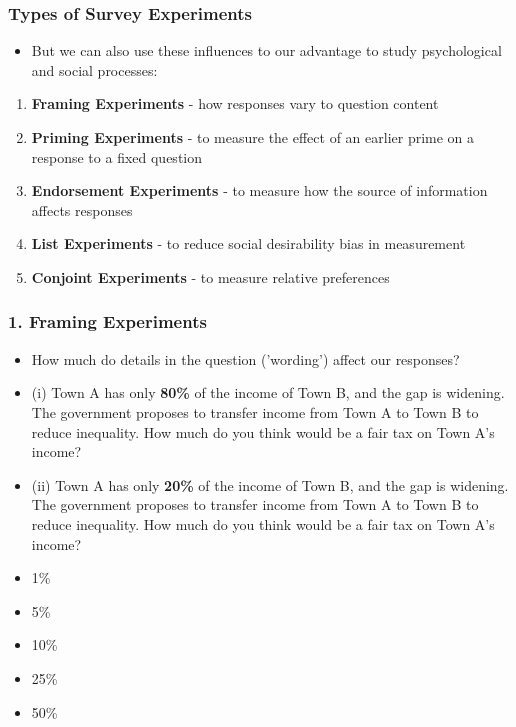 \documentclass[xcolor=x11names,compress]{beamer}\usepackage[]{graphicx}\usepackage[]{color}
\renewcommand{\(}{\begin{columns}}
\renewcommand{\)}{\end{columns}}
\newcommand{\<}[1]{\begin{column}{#1}}
\renewcommand{\>}{\end{column}}
\begin{document}
\begin{frame}
\frametitle{Types of Survey Experiments}
\begin{itemize}
\item But we can also use these influences to our advantage to study psychological and social processes:
\pause
\end{itemize}
\begin{enumerate}
\item \textbf{Framing Experiments} - how responses vary to question content
\pause
\item \textbf{Priming Experiments} - to measure the effect of an earlier prime on a response to a fixed question
\pause
\item \textbf{Endorsement Experiments} - to measure how the source of information affects responses
\pause
\item \textbf{List Experiments} - to reduce social desirability bias in measurement
\pause
\item \textbf{Conjoint Experiments} - to measure relative preferences
\end{enumerate}
\end{frame}

\begin{frame}
\frametitle{1. Framing Experiments}
\begin{itemize}
\item How much do details in the question ('wording') affect our responses?
\pause
\item (i) Town A has only \textbf{80\%} of the income of Town B, and the gap is widening. The government proposes to transfer income from Town A to Town B to reduce inequality. How much do you think would be a fair tax on Town A's income?
\pause
\item (ii) Town A has only \textbf{20\%} of the income of Town B, and the gap is widening. The government proposes to transfer income from Town A to Town B to reduce inequality. How much do you think would be a fair tax on Town A's income?
\pause
\item 1\%
\item 5\%
\item 10\%
\item 25\%
\item 50\%
\end{itemize}
\end{frame}
\end{document}
